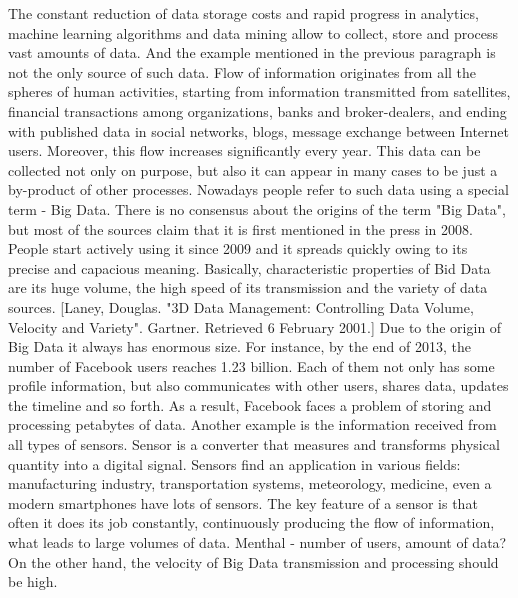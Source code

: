 The constant reduction of data storage costs and rapid progress in analytics, machine learning algorithms and data mining allow to collect, store and process vast amounts of data. And the example mentioned in the previous paragraph is not the only source of such data. Flow of information originates from all the spheres of human activities, starting from information transmitted from satellites, financial transactions among organizations, banks and broker-dealers, and ending with published data in social networks, blogs, message exchange between Internet users. Moreover, this flow increases significantly every year. This data can be collected not only on purpose, but also it can appear in many cases to be just a by-product of other processes. Nowadays people refer to such data using a special term - Big Data. There is no consensus about the origins of the term "Big Data", but most of the sources claim that it is first mentioned in the press in 2008. People start actively using it since 2009 and it spreads quickly owing to its precise and capacious meaning. 
Basically, characteristic properties of Bid Data are its huge volume, the high speed of its transmission and the variety of data sources. [Laney, Douglas. "3D Data Management: Controlling Data Volume, Velocity and Variety". Gartner. Retrieved 6 February 2001.] Due to the origin of Big Data it always has enormous size. For instance, by the end of 2013, the number of Facebook users reaches 1.23 billion. Each of them not only has some profile information, but also communicates with other users, shares data, updates the timeline and so forth. As a result, Facebook faces a problem of storing and processing petabytes of data. Another example is the information received from all types of sensors. Sensor is a converter that measures and transforms physical quantity into a digital signal. Sensors find an application in various fields: manufacturing industry, transportation systems, meteorology, medicine, even a modern smartphones have lots of sensors. The key feature of a sensor is that often it does its job constantly, continuously producing the flow of information, what leads to large volumes of data. Menthal - number of users, amount of data?
On the other hand, the velocity of Big Data transmission and processing should be high. 



